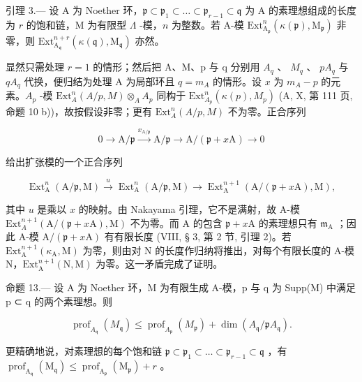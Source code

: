 引理 3.--- 设 A 为 Noether 环，\(\mathfrak{p} \subset \mathfrak{p}_1 \subset \ldots \subset \mathfrak{p}_{r-1} \subset \mathfrak{q}\) 为 A 的素理想组成的长度为 \(r\) 的饱和链，M 为有限型 \(\Lambda\) -模，\(n\) 为整数。若 A-模 \(\mathrm{Ext}_{\mathrm{A}_{\mathfrak{p}}}^{n}(\kappa(\mathfrak{p}), \mathrm{M}_{\mathfrak{p}})\) 非零，则 \(\mathrm{Ext}_{\mathrm{A}_{\mathfrak{q}}}^{n+r}(\kappa(\mathfrak{q}), \mathrm{M}_{\mathfrak{q}})\) 亦然。

显然只需处理 \(r = 1\) 的情形；然后把 A、M、p 与 q 分别用 \(A_q\) 、 \(M_q\) 、 \(pA_q\) 与 \(qA_q\) 代换，便归结为处理 A 为局部环且 \(q = m_A\) 的情形。设 \(x\) 为 \(m_A - p\) 的元素。\(A_p\) -模 \(\text{Ext}_A^n(A/p, M) \otimes_A A_p\) 同构于 \(\text{Ext}_{A_p}^n(\kappa(p), M_p)\) (A, X, 第 111 页, 命题 10 b))，故按假设非零；更有 \(\text{Ext}_A^n(A/p, M)\) 不为零。正合序列

\[
0 \rightarrow \mathrm{A} / \mathfrak {p} \stackrel {{x _ {\mathrm{A} / \mathfrak {p}}}} {{\longrightarrow}} \mathrm{A} / \mathfrak {p} \longrightarrow \mathrm{A} / (\mathfrak {p} + x \mathrm{A}) \rightarrow 0
\]

给出扩张模的一个正合序列

\[
\operatorname{Ext} _ {\mathrm{A}} ^ {n} (\mathrm{A} / \mathfrak {p}, \mathrm{M}) \xrightarrow {u} \operatorname{Ext} _ {\mathrm{A}} ^ {n} (\mathrm{A} / \mathfrak {p}, \mathrm{M}) \longrightarrow \operatorname{Ext} _ {\mathrm{A}} ^ {n + 1} (\mathrm{A} / (\mathfrak {p} + x \mathrm{A}), \mathrm{M}),
\]

其中 \(u\) 是乘以 \(x\) 的映射。由 Nakayama 引理，它不是满射，故 A-模 \(\text{Ext}_A^{n+1}(\text{A}/(\mathfrak{p} + x\text{A}), \text{M})\) 不为零。而 A 的包含 \(\mathfrak{p} + x\text{A}\) 的素理想只有 \(\mathfrak{m}_\text{A}\) ；因此 A-模 \(\text{A}/(\mathfrak{p} + x\text{A})\) 有有限长度 (VIII, § 3, 第 2 节, 引理 2)。若 \(\text{Ext}_\text{A}^{n+1}(\kappa_\text{A}, \text{M})\) 为零，则由对 N 的长度作归纳将推出，对每个有限长度的 A-模 N，\(\text{Ext}_\text{A}^{n+1}(\text{N}, \text{M})\) 为零。这一矛盾完成了证明。

命题 13.--- 设 A 为 Noether 环，M 为有限生成 A-模，p 与 q 为 Supp(M) 中满足 p ⊂ q 的两个素理想。则

\[
\operatorname{prof} _ {A _ {\mathfrak {q}}} (M _ {\mathfrak {q}}) \leqslant \operatorname{prof} _ {A _ {\mathfrak {p}}} (M _ {\mathfrak {p}}) + \dim (A _ {\mathfrak {q}} / \mathfrak {p} A _ {\mathfrak {q}}).
\]

更精确地说，对素理想的每个饱和链 \(\mathfrak{p} \subset \mathfrak{p}_1 \subset \ldots \subset \mathfrak{p}_{r-1} \subset \mathfrak{q}\) ，有 \(\operatorname{prof}_{\mathrm{A}_{\mathfrak{q}}}(\mathrm{M}_{\mathfrak{q}}) \leqslant \operatorname{prof}_{\mathrm{A}_{\mathfrak{p}}}(\mathrm{M}_{\mathfrak{p}}) + r\) 。

